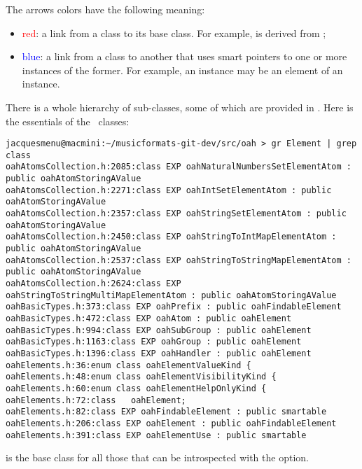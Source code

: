 The arrows colors have the following meaning:
\begin{itemize}
\item \textcolor{red}{red}: a link from a class   to its base class. For example,  is derived from ;

\item \textcolor{blue}{blue}: a link from a class   to another that uses smart pointers to one or more instances of the former. For example, an  instance may be an element of an  instance.
\end{itemize}

There is a whole hierarchy of  sub-classes, some of which are provided in . Here is the essentials of the \oahRepr\ classes:
\begin{lstlisting}[language=TerminalSmall]
jacquesmenu@macmini:~/musicformats-git-dev/src/oah > gr Element | grep class
oahAtomsCollection.h:2085:class EXP oahNaturalNumbersSetElementAtom : public oahAtomStoringAValue
oahAtomsCollection.h:2271:class EXP oahIntSetElementAtom : public oahAtomStoringAValue
oahAtomsCollection.h:2357:class EXP oahStringSetElementAtom : public oahAtomStoringAValue
oahAtomsCollection.h:2450:class EXP oahStringToIntMapElementAtom : public oahAtomStoringAValue
oahAtomsCollection.h:2537:class EXP oahStringToStringMapElementAtom : public oahAtomStoringAValue
oahAtomsCollection.h:2624:class EXP oahStringToStringMultiMapElementAtom : public oahAtomStoringAValue
oahBasicTypes.h:373:class EXP oahPrefix : public oahFindableElement
oahBasicTypes.h:472:class EXP oahAtom : public oahElement
oahBasicTypes.h:994:class EXP oahSubGroup : public oahElement
oahBasicTypes.h:1163:class EXP oahGroup : public oahElement
oahBasicTypes.h:1396:class EXP oahHandler : public oahElement
oahElements.h:36:enum class oahElementValueKind {
oahElements.h:48:enum class oahElementVisibilityKind {
oahElements.h:60:enum class oahElementHelpOnlyKind {
oahElements.h:72:class   oahElement;
oahElements.h:82:class EXP oahFindableElement : public smartable
oahElements.h:206:class EXP oahElement : public oahFindableElement
oahElements.h:391:class EXP oahElementUse : public smartable
\end{lstlisting}

 is the base class   for all those that can be introspected with the  option.


